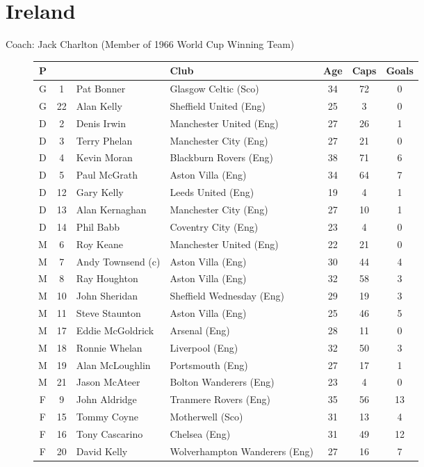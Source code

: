 \chapter{Ireland}
\newline
\newline
Coach: Jack Charlton (Member of 1966 World Cup Winning Team)
\begin{figure}[H]
\begin{tabular}{c c l l c c c}
P & & & Club & Age & Caps & Goals \\ \hline
G & 1 & Pat Bonner & Glasgow Celtic (Sco) & 34 & 72 & 0 \\
G & 22 & Alan Kelly & Sheffield United (Eng) & 25 & 3 & 0 \\ \hline
D & 2 & Denis Irwin & Manchester United (Eng) & 27 & 26 & 1 \\
D & 3 & Terry Phelan & Manchester City (Eng) & 27 & 21 & 0 \\
D & 4 & Kevin Moran & Blackburn Rovers (Eng) & 38 & 71 & 6 \\
D & 5 & Paul McGrath & Aston Villa (Eng) & 34 & 64 & 7 \\
D & 12 & Gary Kelly & Leeds United (Eng) & 19 & 4 & 1 \\
D & 13 & Alan Kernaghan & Manchester City (Eng) & 27 & 10 & 1 \\
D & 14 & Phil Babb & Coventry City (Eng) & 23 & 4 & 0 \\ \hline
M & 6 & Roy Keane & Manchester United (Eng) & 22 & 21 & 0 \\
M & 7 & Andy Townsend (c) & Aston Villa (Eng) & 30 & 44 & 4 \\
M & 8 & Ray Houghton & Aston Villa (Eng) & 32 & 58 & 3 \\
M & 10 & John Sheridan & Sheffield Wednesday (Eng) & 29 & 19 & 3 \\
M & 11 & Steve Staunton & Aston Villa (Eng) & 25 & 46 & 5 \\
M & 17 & Eddie McGoldrick & Arsenal (Eng) & 28 & 11 & 0 \\
M & 18 & Ronnie Whelan & Liverpool (Eng) & 32 & 50 & 3 \\
M & 19 & Alan McLoughlin & Portsmouth (Eng) & 27 & 17 & 1 \\
M & 21 & Jason McAteer & Bolton Wanderers (Eng) & 23 & 4 & 0 \\ \hline
F & 9 & John Aldridge & Tranmere Rovers (Eng) & 35 & 56 & 13 \\
F & 15 & Tommy Coyne & Motherwell (Sco) & 31 & 13 & 4 \\
F & 16 & Tony Cascarino & Chelsea (Eng) & 31 & 49 & 12 \\
F & 20 & David Kelly & Wolverhampton Wanderers (Eng) & 27 & 16 & 7 \\ \hline
\end{tabular}
\end{figure}
